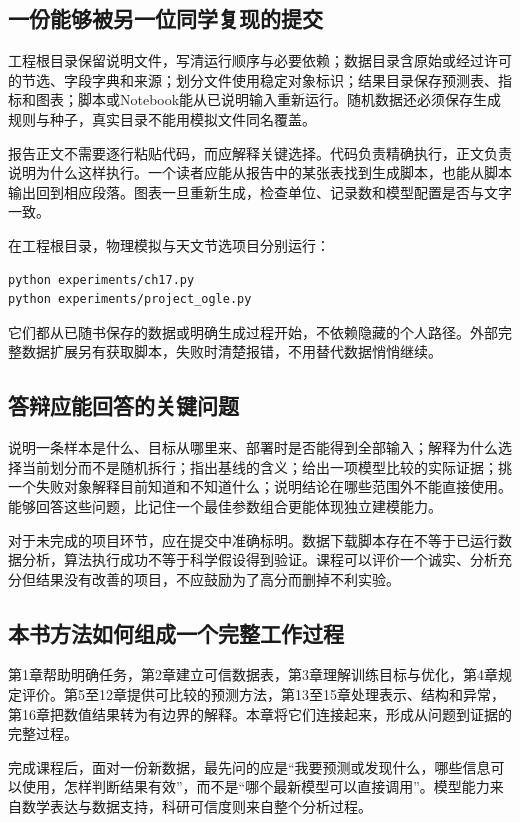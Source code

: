 \subsection{一份能够被另一位同学复现的提交}
工程根目录保留说明文件，写清运行顺序与必要依赖；数据目录含原始或经过许可的节选、字段字典和来源；划分文件使用稳定对象标识；结果目录保存预测表、指标和图表；脚本或Notebook能从已说明输入重新运行。随机数据还必须保存生成规则与种子，真实目录不能用模拟文件同名覆盖。

报告正文不需要逐行粘贴代码，而应解释关键选择。代码负责精确执行，正文负责说明为什么这样执行。一个读者应能从报告中的某张表找到生成脚本，也能从脚本输出回到相应段落。图表一旦重新生成，检查单位、记录数和模型配置是否与文字一致。

在工程根目录，物理模拟与天文节选项目分别运行：
\begin{lstlisting}[language=bash]
python experiments/ch17.py
python experiments/project_ogle.py
\end{lstlisting}
它们都从已随书保存的数据或明确生成过程开始，不依赖隐藏的个人路径。外部完整数据扩展另有获取脚本，失败时清楚报错，不用替代数据悄悄继续。

\subsection{答辩应能回答的关键问题}
说明一条样本是什么、目标从哪里来、部署时是否能得到全部输入；解释为什么选择当前划分而不是随机拆行；指出基线的含义；给出一项模型比较的实际证据；挑一个失败对象解释目前知道和不知道什么；说明结论在哪些范围外不能直接使用。能够回答这些问题，比记住一个最佳参数组合更能体现独立建模能力。

对于未完成的项目环节，应在提交中准确标明。数据下载脚本存在不等于已运行数据分析，算法执行成功不等于科学假设得到验证。课程可以评价一个诚实、分析充分但结果没有改善的项目，不应鼓励为了高分而删掉不利实验。

\subsection{本书方法如何组成一个完整工作过程}
第1章帮助明确任务，第2章建立可信数据表，第3章理解训练目标与优化，第4章规定评价。第5至12章提供可比较的预测方法，第13至15章处理表示、结构和异常，第16章把数值结果转为有边界的解释。本章将它们连接起来，形成从问题到证据的完整过程。

完成课程后，面对一份新数据，最先问的应是“我要预测或发现什么，哪些信息可以使用，怎样判断结果有效”，而不是“哪个最新模型可以直接调用”。模型能力来自数学表达与数据支持，科研可信度则来自整个分析过程。

